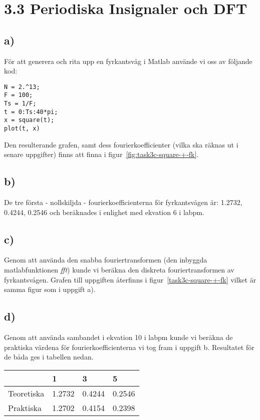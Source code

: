 \section*{3.3 Periodiska Insignaler och DFT}
\subsection*{a)}
För att generera och rita upp en fyrkantsvåg i Matlab använde vi oss av
följande kod:

\begin{lstlisting}
N = 2.^13;
F = 100;
Ts = 1/F;
t = 0:Ts:40*pi;
x = square(t);
plot(t, x)
\end{lstlisting}

Den resulterande grafen, samt dess fourierkoefficienter (vilka ska räknas ut i
senare uppgifter) finns att finna i figur~\ref{fig:task3c-square-+-fk}.

\subsection*{b)}
De tre första - nollskiljda - fourierkoefficienterna för fyrkantsvågen är: 
1.2732, 0.4244, 0.2546 och beräknades i enlighet med ekvation 6 i labpm.

\subsection*{c)}
Genom att använda den snabba fouriertransformen (den inbyggda matlabfunktionen
\emph{fft}) kunde vi beräkna den diskreta fouriertransformen av fyrkantsvågen.
Grafen till uppgiften återfinns i figur~\ref{task3c-square-+-fk} vilket är
samma figur som i uppgift a).

\subsection*{d)}
Genom att använda sambandet i ekvation 10 i labpm kunde vi beräkna de praktiska
värdena för fourierkoefficienterna vi tog fram i uppgift b. Resultatet för de
båda ges i tabellen nedan.

\begin{tabular}{| l | l | l | l |}
    \hline
     & 1 & 3 & 5 \\ \hline
    Teoretiska & 1.2732 & 0.4244 & 0.2546 \\ \hline
    Praktiska & 1.2702 & 0.4154 & 0.2398 \\ \hline
\end{tabular}

